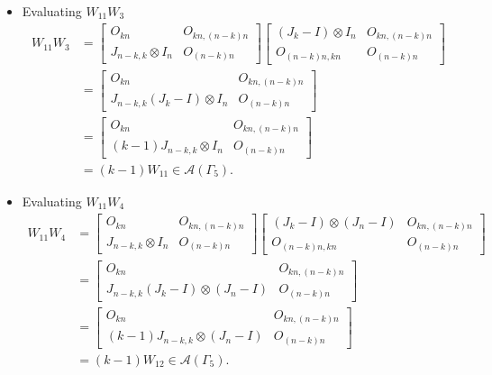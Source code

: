 \begin{itemize}
\item Evaluating $W_{11}W_{3}$
\begin{align*}
     W_{11}W_{3}
    &= \begin{bmatrix}
        O_{kn} & O_{kn, (n-k)n} \\
        J_{n-k, k}\otimes I_n & O_{(n-k)n}
    \end{bmatrix}
    \begin{bmatrix}
        (J_k-I)\otimes I_n & O_{kn, (n-k)n} \\
        O_{(n-k)n,kn} & O_{(n-k)n}
    \end{bmatrix}\\
    &= \begin{bmatrix}
        O_{kn} & O_{kn, (n-k)n} \\
        J_{n-k, k}(J_k-I)\otimes I_n & O_{(n-k)n}
    \end{bmatrix}\\
    &= \begin{bmatrix}
        O_{kn} & O_{kn, (n-k)n} \\
        (k-1)J_{n-k, k}\otimes I_n & O_{(n-k)n}
    \end{bmatrix}\\
    &= (k-1)W_{11}\in\mathcal{A}(\Gamma_5).
\end{align*}

\item Evaluating $W_{11}W_{4}$
\begin{align*}
     W_{11}W_{4}
    &= \begin{bmatrix}
        O_{kn} & O_{kn, (n-k)n} \\
        J_{n-k, k}\otimes I_n & O_{(n-k)n}
    \end{bmatrix}
    \begin{bmatrix}
        (J_k-I)\otimes (J_n-I) & O_{kn, (n-k)n} \\
        O_{(n-k)n,kn} & O_{(n-k)n}
    \end{bmatrix}\\
    &= \begin{bmatrix}
        O_{kn} & O_{kn, (n-k)n} \\
        J_{n-k, k}(J_k-I)\otimes (J_n-I) & O_{(n-k)n}
    \end{bmatrix}\\
    &= \begin{bmatrix}
        O_{kn} & O_{kn, (n-k)n} \\
        (k-1)J_{n-k, k}\otimes (J_n-I) & O_{(n-k)n}
    \end{bmatrix}\\
    &= (k-1)W_{12}\in\mathcal{A}(\Gamma_5).
\end{align*}


\end{itemize}
